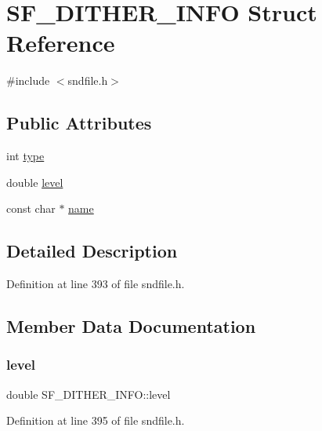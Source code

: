 \hypertarget{struct_s_f___d_i_t_h_e_r___i_n_f_o}{}\section{S\+F\+\_\+\+D\+I\+T\+H\+E\+R\+\_\+\+I\+N\+FO Struct Reference}
\label{struct_s_f___d_i_t_h_e_r___i_n_f_o}


{\ttfamily \#include $<$sndfile.\+h$>$}

\subsection*{Public Attributes}
\begin{DoxyCompactItemize}
\item 
int \mbox{\hyperlink{struct_s_f___d_i_t_h_e_r___i_n_f_o_aa2c525816e397993af8b95c0d4c7c69d}{type}}
\item 
double \mbox{\hyperlink{struct_s_f___d_i_t_h_e_r___i_n_f_o_ab2103a4159cf90c75df76318eaa5eb7f}{level}}
\item 
const char $\ast$ \mbox{\hyperlink{struct_s_f___d_i_t_h_e_r___i_n_f_o_ad43ee482e09cdac24a3a79f186d8f715}{name}}
\end{DoxyCompactItemize}


\subsection{Detailed Description}


Definition at line 393 of file sndfile.\+h.



\subsection{Member Data Documentation}
\mbox{\label{struct_s_f___d_i_t_h_e_r___i_n_f_o_ab2103a4159cf90c75df76318eaa5eb7f}} 
\subsubsection{\texorpdfstring{level}{level}}
{\footnotesize\ttfamily double S\+F\+\_\+\+D\+I\+T\+H\+E\+R\+\_\+\+I\+N\+F\+O\+::level}



Definition at line 395 of file sndfile.\+h.

